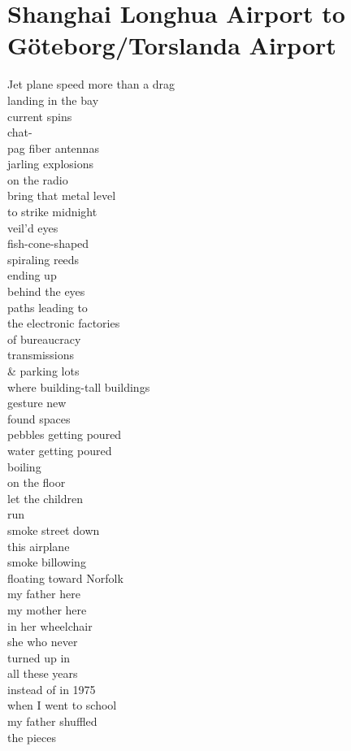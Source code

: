 \documentclass[smalldemyvopaper,11pt,twoside,onecolumn,openright,extrafontsizes]{memoir}
\begin{document}
\chapter{Shanghai Longhua Airport to Göteborg/Torslanda Airport}
Jet plane speed more than a drag
\\landing in the bay
\\current spins
\\chat-
\\pag fiber antennas
\\jarling explosions
\\on the radio
\\bring that metal level
\\to strike midnight
\\veil'd eyes
\\fish-cone-shaped
\\spiraling reeds
\\ending up
\\behind the eyes
\\paths leading to
\\the electronic factories
\\of bureaucracy
\\transmissions
\\\& parking lots
\\where building-tall buildings
\\gesture new
\\found spaces
\\pebbles getting poured
\\water getting poured
\\boiling
\\on the floor
\\let the children
\\run
\\smoke street down
\\this airplane
\\smoke billowing
\\floating toward Norfolk
\\my father here
\\my mother here
\\in her wheelchair
\\she who never
\\turned up in
\\all these years
\\instead of in 1975
\\when I went to school
\\my father shuffled
\\the pieces
\end{document}

